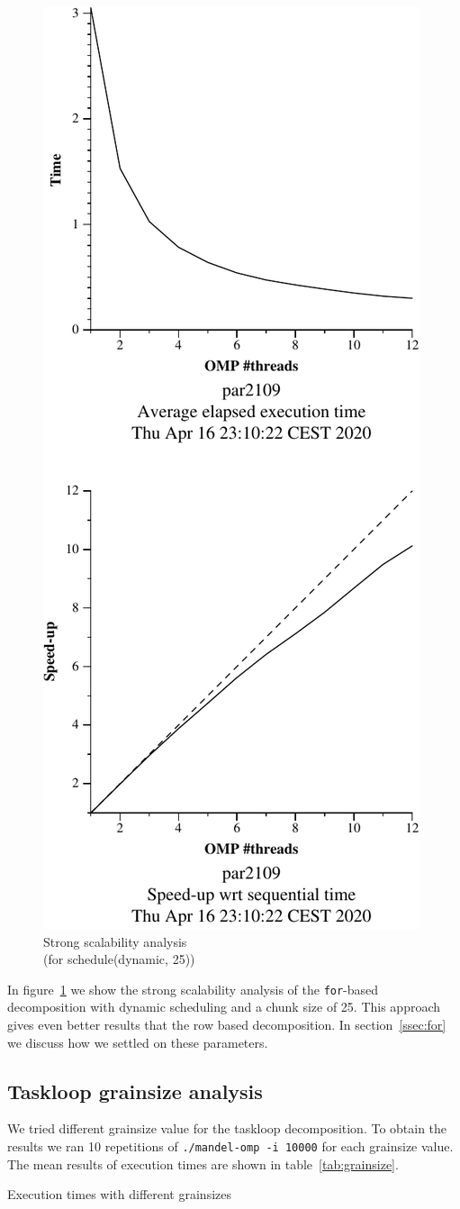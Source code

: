 \begin{figure}[H]
    \centering
    \includegraphics[width=0.35\linewidth]{plots/v11-crop.pdf}
    \caption{Strong scalability analysis \\ (for schedule(dynamic, 25))}
    \label{fig:ssa_v11} 
\end{figure}

In figure~\ref{fig:ssa_v11} we show the strong scalability analysis of the \texttt{for}-based decomposition
with dynamic scheduling and a chunk size of 25. This approach gives even better results that the row based
decomposition. In section~\ref{ssec:for} we discuss how we settled on these parameters.

\pagebreak
\subsection{Taskloop grainsize analysis}

We tried different grainsize value for the taskloop decomposition. To obtain the results we ran
10 repetitions of \texttt{./mandel-omp -i 10000} for each grainsize value. The mean results of
execution times are shown in table~\ref{tab:grainsize}.

\begin{table}[H]
    \caption{Execution times with different grainsizes}%
    \label{tab:grainsize}
    \begin{center}
    
    \end{center}
\end{table}

